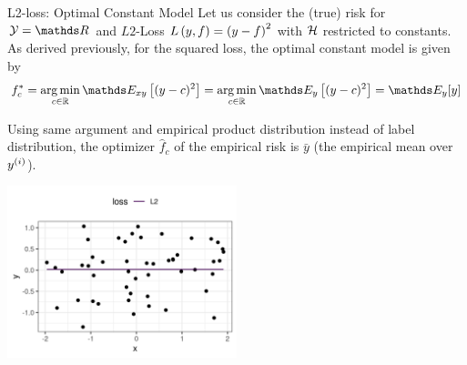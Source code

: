 \documentclass[11pt,compress,t,notes=noshow, xcolor=table]{beamer}
\begin{document}
\begin{vbframe}{L2-loss: Optimal Constant Model}
Let us consider the (true) risk for  $\Yspace = \R$ and $L2$-Loss $L\left(y, f\right) = \left(y-f\right)^2$ with $\mathcal{H}$ restricted to constants. %
As derived previously, for the squared loss, the optimal constant model is given by 
\vspace{-0.2cm}
$$f_{c}^{\ast} = \argmin_{c \in \mathbb{R}} \E_{xy} \left[(y-c)^2\right] = \argmin_{c \in \mathbb{R}} \E_{y} \left[(y-c)^2\right]=\E_{y}[y]$$



Using same argument and empirical product distribution instead of label distribution, the optimizer $\hat{f}_{c}$ of the empirical risk is $\bar y$ (the empirical mean over $y^{(i)}$). 
\vspace{-0.5cm}
\begin{center}
\includegraphics[width = 0.5\textwidth ]{figure/L2-loss.png} \\
\end{center}


\end{vbframe}
\end{document}
